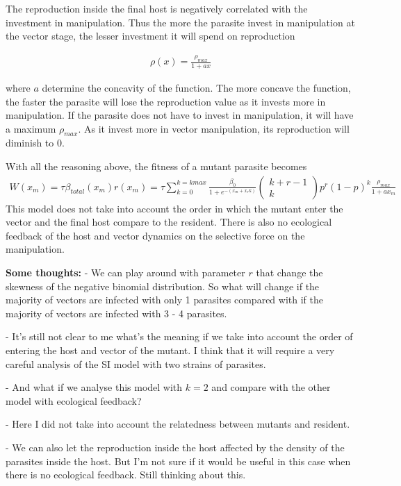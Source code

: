 \documentclass{article}
\begin{document}
The reproduction inside the final host is negatively correlated with the investment in manipulation. Thus the more the parasite invest in manipulation at the vector stage, the lesser investment it will spend on reproduction 

\begin{align*}
    \rho(x) = \frac{\rho_{max}}{1 + a x}
\end{align*}

where $a$ determine the concavity of the function. The more concave the function, the faster the parasite will lose the reproduction value as it invests more in manipulation. If the parasite does not have to invest in manipulation, it will have a maximum $\rho_{max}$. As it invest more in vector manipulation, its reproduction will diminish to 0.

With all the reasoning above, the fitness of a mutant parasite becomes
\begin{align*}
    W(x_m) = \tau \beta_{total}(x_m) r(x_m) = \tau \sum_{k = 0}^{k = kmax} \frac{\beta_0}{1 + e^{-(x_m + x_r  k)}} \begin{pmatrix} k + r - 1 \\ k\end{pmatrix}p^r (1 -p)^k  \frac{\rho_{max}}{1 + a x_m}
\end{align*}
This model does not take into account the order in which the mutant enter the vector and the final host compare to the resident. There is also no ecological feedback of the host and vector dynamics on the selective force on the manipulation.

\textbf{Some thoughts:} 
- We can play around with parameter $r$ that change the skewness of the negative binomial distribution. So what will change if the majority of vectors are infected with only 1 parasites compared with if the majority of vectors are infected with 3 - 4 parasites.

- It's still not clear to me what's the meaning if we take into account the order of entering the host and vector of the mutant. I think that it will require a very careful analysis of the SI model with two strains of parasites. 

- And what if we analyse this model with $k = 2$ and compare with the other model with ecological feedback?

- Here I did not take into account the relatedness between mutants and resident. 

- We can also let the reproduction inside the host affected by the density of the parasites inside the host. But I'm not sure if it would be useful in this case when there is no ecological feedback. Still thinking about this.
\end{document}
